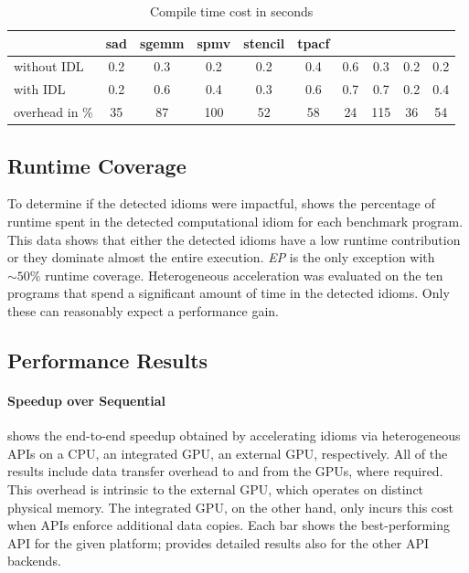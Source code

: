 \begin{table}[p]
\begin{tabular}{lccccccccc}
  & \hspace{0.44mm}sad\hspace{0.44mm}
  & \hspace{0.44mm}sgemm\hspace{0.44mm}
  & \hspace{0.44mm}spmv\hspace{0.44mm}
  & \hspace{0.44mm}stencil\hspace{0.44mm}
  & \hspace{0.44mm}tpacf\hspace{0.44mm} \\
  \midrule
without IDL    & 0.2 & 0.3 & 0.2 & 0.2 & 0.4 & 0.6 & 0.3 & 0.2 & 0.2 \\[0.25em]
with IDL       & 0.2 & 0.6 & 0.4 & 0.3 & 0.6 & 0.7 & 0.7 & 0.2 & 0.4 \\[0.75em]
overhead in \% &  35 &  87 & 100 &  52 &  58 &  24 & 115 &  36 &  54 \\
  \bottomrule
\end{tabular}
\caption{Compile time cost in seconds}
\label{tab:compiletimecost}
\end{table}

\subsection{Runtime Coverage}

    To determine if the detected idioms were impactful, 
    shows the percentage of runtime spent in the detected computational idiom
    for each benchmark program.
    This data shows that either the detected idioms have a low runtime
    contribution or they dominate almost the entire execution.
    \emph{EP} is the only exception with ${\sim}50\%$ runtime coverage.
    Heterogeneous acceleration was evaluated on the ten programs that spend a
    significant amount of time in the detected idioms.
    Only these can reasonably expect a performance gain.

\subsection{Performance Results}

\paragraph*{Speedup over Sequential}

     shows the end-to-end speedup obtained by
    accelerating idioms via heterogeneous APIs on a CPU, an integrated GPU,
    an external GPU, respectively.
    All of the results include data transfer overhead to and from the GPUs,
    where required.
    This overhead is intrinsic to the external GPU, which operates on distinct
    physical memory.
    The integrated GPU, on the other hand, only incurs this cost when APIs
    enforce additional data copies.
    Each bar shows the best-performing API for the given platform;
     provides detailed results also for the other
    API backends.

